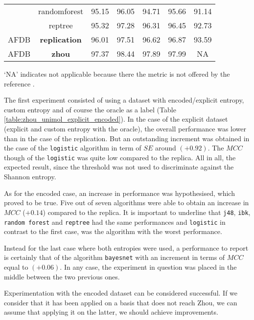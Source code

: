 \begin{table}[h]
\begin{center}
\begin{threeparttable}
\begin{tabular}{c c c c c c c}
  & randomforest & 95.15 & 96.05 & 94.71 & 95.66 & 91.14 \\
  & reptree & 95.32 & 97.28 & 96.31 & 96.45 & 92.73 \\
  \hline
  AFDB & \textbf{replication} & 96.01 & 97.51 & 96.62 & 96.87 & 93.59 \\
  \hline
  AFDB & \textbf{zhou} & 97.37 & 98.44 & 97.89 & 97.99 & NA \\
  \bottomrule
\end{tabular}
\begin{tablenotes}
 	\item ‘NA’ indicates not applicable because there the metric is not offered by the reference \cite{zhou2015}.
    \end{tablenotes}
\end{threeparttable}
\end{center}
\end{table}

The first experiment consisted of using a dataset with encoded/explicit entropy, custom entropy and of course the oracle as a label (Table \ref{table:zhou_unimol_explicit_encoded}). In the case of the explicit dataset (explicit and custom entropy with the oracle), the overall performance was lower than in the case of the replication. But an outstanding increment was obtained in the case of the \verb|logistic| algorithm in term of $SE$ around $(+0.92)$. The $MCC$ though of the \verb|logistic| was quite low compared to the replica. All in all, the expected result, since the threshold was not used to discriminate against the Shannon entropy. 

As for the encoded case, an increase in performance was hypothesised, which proved to be true. Five out of seven algorithms were able to obtain an increase in $MCC$ ($+0.14$) compared to the replica. It is important to underline that \verb|j48|, \verb|ibk|, \verb|random forest| and \verb|reptree| had the same performances and \verb|logistic| in contrast to the first case, was the algorithm with the worst performance.

Instead for the last case where both entropies were used, a performance to report is certainly that of the algorithm \verb|bayesnet| with an increment in terms of $MCC$ equal to $(+0.06)$. In any case, the experiment in question was placed in the middle between the two previous ones.

Experimentation with the encoded dataset can be considered successful. If we consider that it has been applied on a basis that does not reach Zhou, we can assume that applying it on the latter, we should achieve improvements.

